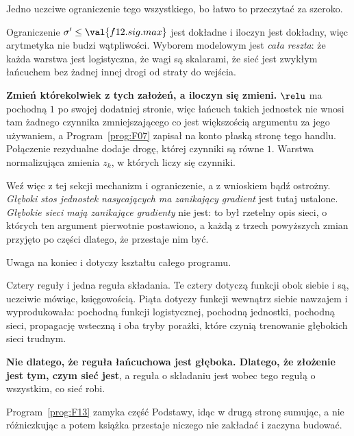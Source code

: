 \begin{fr}
Jedno uczciwe ograniczenie tego wszystkiego, bo łatwo to przeczytać za
szeroko.

Ograniczenie $\sigma' \le \val{f12.sig.max}$ jest dokładne i iloczyn jest
dokładny, więc arytmetyka nie budzi wątpliwości. Wyborem modelowym jest
\emph{cała reszta}: że każda warstwa jest logistyczna, że wagi są skalarami,
że sieć jest zwykłym łańcuchem bez żadnej innej drogi od straty do wejścia.

\textbf{Zmień którekolwiek z tych założeń, a iloczyn się zmieni.} $\relu$ ma
pochodną $1$ po swojej dodatniej stronie, więc łańcuch takich jednostek nie
wnosi tam żadnego czynnika zmniejszającego \dash{} co jest większością
argumentu za jego używaniem, a Program~\ref{prog:F07} zapisał na konto płaską
stronę tego handlu. Połączenie rezydualne dodaje drogę, której czynniki są
równe $1$. Warstwa normalizująca zmienia $z_k$, w których liczy się czynniki.

Weź więc z tej sekcji mechanizm i ograniczenie, a z wnioskiem bądź ostrożny.
\emph{Głęboki stos jednostek nasycających ma zanikający gradient} jest tutaj
ustalone. \emph{Głębokie sieci mają zanikające gradienty} nie jest: to był
rzetelny opis sieci, o których ten argument pierwotnie postawiono, a każdą z
trzech powyższych zmian przyjęto po części dlatego, że przestaje nim być.
\end{fr}

\begin{fr}
Uwaga na koniec i dotyczy kształtu całego programu.

Cztery reguły i jedna reguła składania. Te cztery dotyczą funkcji obok siebie
i są, uczciwie mówiąc, księgowością. Piąta dotyczy funkcji wewnątrz siebie
nawzajem i wyprodukowała: pochodną funkcji logistycznej, pochodną jednostki,
pochodną sieci, propagację wsteczną i oba tryby porażki, które czynią
trenowanie głębokich sieci trudnym.

\textbf{Nie dlatego, że reguła łańcuchowa jest głęboka. Dlatego, że złożenie
jest tym, czym sieć jest}, a reguła o składaniu jest wobec tego regułą o
wszystkim, co sieć robi.

Program~\ref{prog:F13} zamyka część Podstawy, idąc w drugą stronę \dash{}
sumując, a nie różniczkując \dash{} a potem książka przestaje niczego nie
zakładać i zaczyna budować.
\end{fr}

